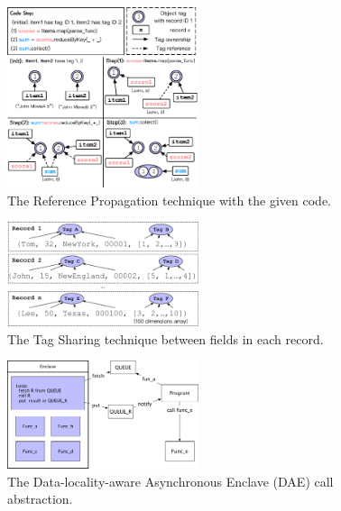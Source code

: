 \documentclass[9pt,a4]{article}
\begin{document}
\begin{figure}
   \center
\includegraphics[width=0.5\textwidth]{figures/reference}
\caption{The Reference Propagation technique with the given code.}
\label{fig:reference}
\end{figure}

\begin{figure}
   \center
\includegraphics[width=0.5\textwidth]{figures/tagcache}
\caption{The Tag Sharing technique between fields in each record.}
\label{fig:tagcache}
\end{figure}

\begin{figure}[tbh]
   \center
   \includegraphics[width=0.5\textwidth]{figures/async_call}
 \caption{The Data-locality-aware Asynchronous Enclave (DAE) call abstraction.}
   \label{fig:async-call}
 \end{figure}

% 
% 

\end{document}
